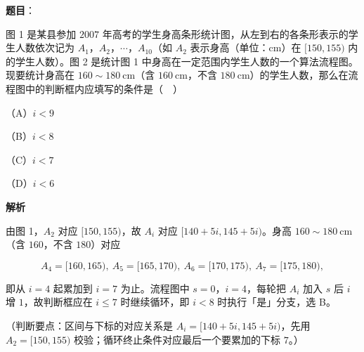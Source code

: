 \begin{answer}

\textbf{题目}：

图 1 是某县参加 $2007$ 年高考的学生身高条形统计图，从左到右的各条形表示的学生人数依次记为 $A_1$，$A_2$，$\cdots$，$A_{10}$（如 $A_2$ 表示身高（单位：$\mathrm{cm}$）在 $[150,155)$ 内的学生人数）。图 2 是统计图 1 中身高在一定范围内学生人数的一个算法流程图。现要统计身高在 $160\sim180\ \mathrm{cm}$（含 $160\ \mathrm{cm}$，不含 $180\ \mathrm{cm}$）的学生人数，那么在流程图中的判断框内应填写的条件是（　）
\nopagebreak[4]
\begin{center}\end{center}
\nopagebreak[4]
\nopagebreak[4]
\begin{center}\end{center}
\nopagebreak[4]
（A）$i<9$

（B）$i<8$

（C）$i<7$

（D）$i<6$

\textbf{解析}

由图 1，$A_2$ 对应 $[150,155)$，故 $A_i$ 对应 $[140+5i,145+5i)$。身高 $160\sim180\ \mathrm{cm}$（含 $160$，不含 $180$）对应

\nopagebreak[4]
\[A_4=[160,165),\ A_5=[165,170),\ A_6=[170,175),\ A_7=[175,180),\]

即从 $i=4$ 起累加到 $i=7$ 为止。流程图中 $s=0$，$i=4$，每轮把 $A_i$ 加入 $s$ 后 $i$ 增 $1$，故判断框应在 $i\leqslant7$ 时继续循环，即 $i<8$ 时执行「是」分支，选 B。

（判断要点：区间与下标的对应关系是 $A_i=[140+5i,145+5i)$，先用 $A_2=[150,155)$ 校验；循环终止条件对应最后一个要累加的下标 $7$。）


\end{answer}
